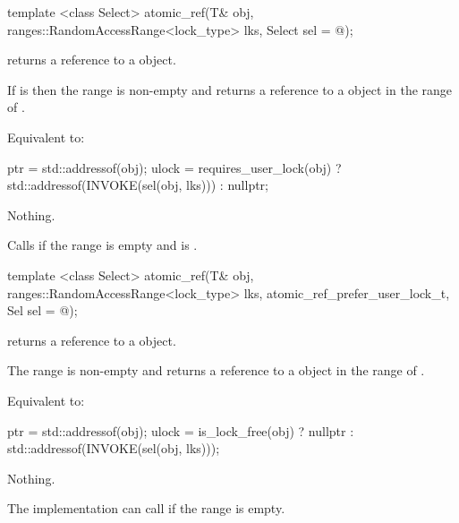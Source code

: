 \begin{addedblock}
\begin{itemdecl}
template <class Select>
atomic_ref(T& obj, ranges::RandomAccessRange<lock_type> lks, 
  Select sel = @\unspec@ );
\end{itemdecl}

\begin{itemdescr}
\pnum
\mandates {} returns
a reference to a  object.

\pnum
\expects If  is  then the 
range  is non-empty and  returns a
reference to a  object in the range of . 

\pnum
\effects Equivalent to:
\begin{codeblock}
  ptr = std::addressof(obj);
  ulock = requires_user_lock(obj) ? 
    std::addressof(INVOKE(sel(obj, lks))) : nullptr;
\end{codeblock}

\pnum
\throws Nothing.

\pnum
\remarks Calls  if the range  is empty and
 is .

\end{itemdescr}
\end{addedblock}


\begin{addedblock}
\begin{itemdecl}
template <class Select>
atomic_ref(T& obj, ranges::RandomAccessRange<lock_type> lks,
  atomic_ref_prefer_user_lock_t, Sel sel = @\unspec@ );
\end{itemdecl}

\begin{itemdescr}
\pnum
\mandates {} returns
a reference to a  object.

\pnum
\expects The range  is non-empty and  returns a
reference to a  object in the range of . 

\pnum
\effects Equivalent to:
\begin{codeblock}
  ptr = std::addressof(obj);
  ulock = is_lock_free(obj) ? 
    nullptr : std::addressof(INVOKE(sel(obj, lks)));
\end{codeblock}

\pnum
\throws Nothing.

\pnum
\remarks The implementation can call  if the range  is empty.

\end{itemdescr}
\end{addedblock}


